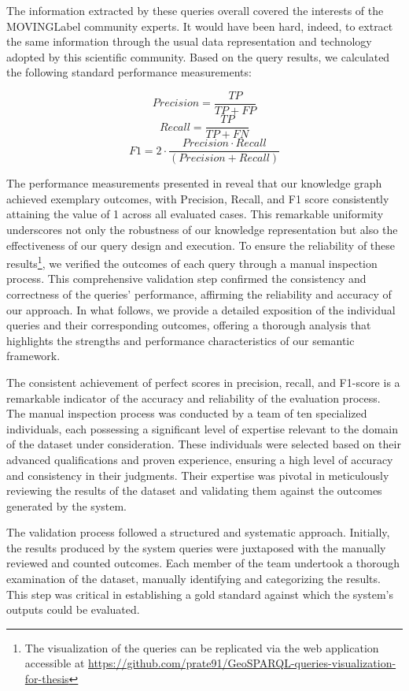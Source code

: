 The information extracted by these queries overall covered the interests of the \acrshort{MOVINGLabel} community experts. It would have been hard, indeed, to extract the same information through the usual data representation and technology adopted by this scientific community. Based on the query results, we calculated the following standard performance measurements: 

\[
Precision = \frac{TP}{TP+FP}
\]
\[
Recall = \frac{TP}{TP+FN}
\]
\[
F1 = 2 \cdot \frac{Precision \cdot Recall}{(Precision+Recall)}
\]

The performance measurements presented in  reveal that our knowledge graph achieved exemplary outcomes, with Precision, Recall, and F1 score consistently attaining the value of 1 across all evaluated cases. This remarkable uniformity underscores not only the robustness of our knowledge representation but also the effectiveness of our query design and execution. To ensure the reliability of these results\footnote{The visualization of the queries can be replicated via the web application accessible at \url{https://github.com/prate91/GeoSPARQL-queries-visualization-for-thesis}}, we verified the outcomes of each query through a manual inspection process. This comprehensive validation step confirmed the consistency and correctness of the queries' performance, affirming the reliability and accuracy of our approach. In what follows, we provide a detailed exposition of the individual queries and their corresponding outcomes, offering a thorough analysis that highlights the strengths and performance characteristics of our semantic framework.

The consistent achievement of perfect scores in precision, recall, and F1-score is a remarkable indicator of the accuracy and reliability of the evaluation process. The manual inspection process was conducted by a team of ten specialized individuals, each possessing a significant level of expertise relevant to the domain of the dataset under consideration. These individuals were selected based on their advanced qualifications and proven experience, ensuring a high level of accuracy and consistency in their judgments. Their expertise was pivotal in meticulously reviewing the results of the dataset and validating them against the outcomes generated by the system.

The validation process followed a structured and systematic approach. Initially, the results produced by the system queries were juxtaposed with the manually reviewed and counted outcomes. Each member of the team undertook a thorough examination of the dataset, manually identifying and categorizing the results. This step was critical in establishing a gold standard against which the system's outputs could be evaluated.

